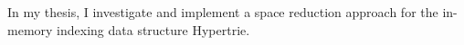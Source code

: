 In my thesis, I investigate and implement a space reduction approach for the in-memory indexing data structure Hypertrie. 